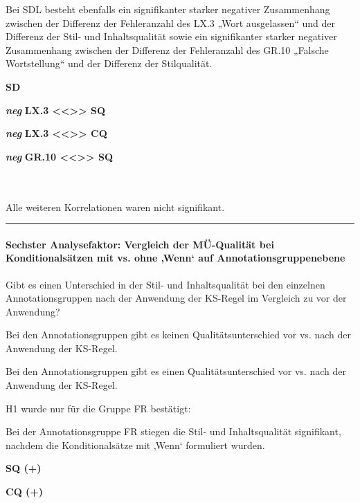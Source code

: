 \medskip
\noindent
\parbox[t]{.7\textwidth}{
Bei SDL besteht ebenfalls ein signifikanter starker negativer Zusammenhang zwischen der Differenz der Fehleranzahl des LX.3 „Wort ausgelassen“ und der Differenz der Stil- und Inhaltsqualität sowie ein signifikanter starker negativer Zusammenhang zwischen der Differenz der Fehleranzahl des GR.10 „Falsche Wortstellung“ und der Differenz der Stilqualität.
}
\parbox[t]{.04\textwidth}{}
\colorbox{smGreen}{\parbox[t]{.25\textwidth}{
{ \textbf{SD}}

{ \textbf{\textit{neg}} \textbf{LX.3 <{}<{}>{}> SQ} }

{ \textbf{\textit{neg}} \textbf{LX.3 <{}<{}>{}> CQ}}

 \textbf{\textit{neg}} \textbf{GR.10 <{}<{}>{}> SQ}\\
 \\
 \\
}}

\medskip
\noindent
\parbox[t]{.7\textwidth}{Alle weiteren Korrelationen waren nicht signifikant.}

\hrule
\paragraph*{Sechster Analysefaktor: Vergleich der MÜ-Qualität bei Konditionalsätzen mit vs. ohne ‚Wenn‘ auf Annotationsgruppenebene}
\begin{description}[font=\normalfont\bfseries]
  \item [Fragestellung:] Gibt es einen Unterschied in der Stil- und Inhaltsqualität bei den einzelnen Annotationsgruppen nach der Anwendung der KS-Regel im Vergleich zu vor der Anwendung?
  \item [H0 --] Bei den Annotationsgruppen gibt es keinen Qualitätsunterschied vor vs. nach der Anwendung der KS-Regel.
  \item [H1 --] Bei den Annotationsgruppen gibt es einen Qualitätsunterschied vor vs. nach der Anwendung der KS-Regel.
  \item [Resultat]
\end{description}
\noindent
\parbox[t]{.8\textwidth}{
H1 wurde nur für die Gruppe FR bestätigt:

Bei der Annotationsgruppe FR stiegen die Stil- und Inhaltsqualität signifikant, nachdem die Konditionalsätze mit ‚Wenn‘ formuliert wurden.
}
\parbox[t]{.04\textwidth}{}
\colorbox{smGreen}{\parbox[t]{.15\textwidth}{
\textbf{SQ (+)}

 \textbf{CQ (+)}\\
 \\
}}

